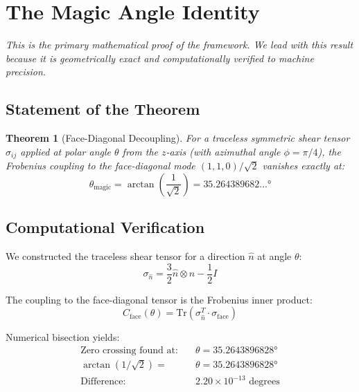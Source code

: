 \documentclass[12pt,a4paper]{article}
\newtheorem{theorem}{Theorem}[section]
\begin{document}
\section{The Magic Angle Identity}
\label{sec:magic_angle}

\emph{This is the primary mathematical proof of the framework. We lead with this result because it is geometrically exact and computationally verified to machine precision.}

\subsection{Statement of the Theorem}

\begin{theorem}[Face-Diagonal Decoupling]
\label{thm:magic_angle}
For a traceless symmetric shear tensor $\sigma_{ij}$ applied at polar angle $\theta$ from the $z$-axis (with azimuthal angle $\phi = \pi/4$), the Frobenius coupling to the face-diagonal mode $(1,1,0)/\sqrt{2}$ vanishes exactly at:
\begin{equation}
\boxed{\theta_{\text{magic}} = \arctan\left(\frac{1}{\sqrt{2}}\right) = 35.264389682...°}
\end{equation}
\end{theorem}

\subsection{Computational Verification}

We constructed the traceless shear tensor for a direction $\hat{n}$ at angle $\theta$:
\begin{equation}
\sigma_{\hat{n}} = \frac{3}{2}\hat{n} \otimes \hat{n} - \frac{1}{2}I
\end{equation}

The coupling to the face-diagonal tensor is the Frobenius inner product:
\begin{equation}
C_{\text{face}}(\theta) = \text{Tr}\left(\sigma_{\hat{n}}^T \cdot \sigma_{\text{face}}\right)
\end{equation}

Numerical bisection yields:
\begin{align}
\text{Zero crossing found at:} \quad &\theta = 35.2643896828° \nonumber \\
\arctan(1/\sqrt{2}) = \quad &\theta = 35.2643896828° \nonumber \\
\text{Difference:} \quad &2.20 \times 10^{-13} \text{ degrees}
\end{align}
\end{document}
